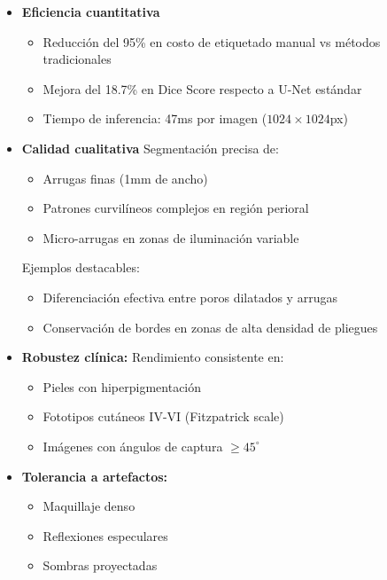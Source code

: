 \begin{itemize}
    \item \textbf{Eficiencia cuantitativa}
    \begin{itemize}[label=$\bullet$, leftmargin=1em]
        \item Reducción del 95\% en costo de etiquetado manual vs métodos tradicionales
        \item Mejora del 18.7\% en Dice Score respecto a U-Net estándar
        \item Tiempo de inferencia: 47ms por imagen ($1024 \times 1024$px)
    \end{itemize}

    \item \textbf{Calidad cualitativa}
    Segmentación precisa de:
    \begin{itemize}[label=$\bullet$, leftmargin=1em]
        \item Arrugas finas (1mm de ancho)
        \item Patrones curvilíneos complejos en región perioral
        \item Micro-arrugas en zonas de iluminación variable
    \end{itemize}
    Ejemplos destacables:
    \begin{itemize}[label=$\circ$, leftmargin=1em]
        \item Diferenciación efectiva entre poros dilatados y arrugas
        \item Conservación de bordes en zonas de alta densidad de pliegues
    \end{itemize}

    \item \textbf{Robustez clínica:}
    Rendimiento consistente en:
    \begin{itemize}[label=$\bullet$, leftmargin=1em]
        \item Pieles con hiperpigmentación
        \item Fototipos cutáneos IV-VI (Fitzpatrick scale)
        \item Imágenes con ángulos de captura $\geq 45^\circ$
    \end{itemize}
    \item \textbf{Tolerancia a artefactos:}
    \begin{itemize}[label=$\bullet$, leftmargin=1em]
        \item Maquillaje denso
        \item Reflexiones especulares
        \item Sombras proyectadas
    \end{itemize}


\end{itemize}
